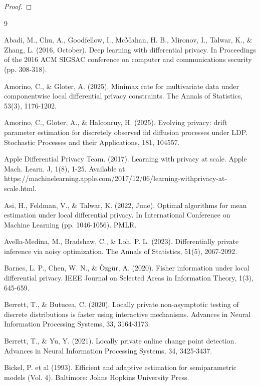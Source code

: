 \documentclass[a4paper, 11pt]{article}
\theoremstyle{definition}
\begin{document}
{\begin{proof}
\end{proof}



\appendix


 
\begin{thebibliography}{9}

 Abadi, M., Chu, A., Goodfellow, I., McMahan, H. B., Mironov, I., Talwar, K., \& Zhang, L. (2016, October). Deep learning with differential privacy. In Proceedings of the 2016 ACM SIGSAC conference on computer and communications security (pp. 308-318).

 Amorino, C., \& Gloter, A. (2025). Minimax rate for multivariate data under componentwise local differential privacy constraints. The Annals of Statistics, 53(3), 1176-1202.

 Amorino, C., Gloter, A., \& Halconruy, H. (2025). Evolving privacy: drift parameter estimation for discretely observed iid diffusion processes under LDP. Stochastic Processes and their Applications, 181, 104557.

 Apple Differential Privacy Team. (2017). Learning with privacy at scale. Apple Mach. Learn. J, 1(8), 1-25. Available at https://machinelearning.apple.com/2017/12/06/learning-withprivacy-at-scale.html.

 Asi, H., Feldman, V., \& Talwar, K. (2022, June). Optimal algorithms for mean estimation under local differential privacy. In International Conference on Machine Learning (pp. 1046-1056). PMLR.

 Avella-Medina, M., Bradshaw, C., \& Loh, P. L. (2023). Differentially private inference via noisy optimization. The Annals of Statistics, 51(5), 2067-2092.

 Barnes, L. P., Chen, W. N., \& Özgür, A. (2020). Fisher information under local differential privacy. IEEE Journal on Selected Areas in Information Theory, 1(3), 645-659.

 Berrett, T., \& Butucea, C. (2020). Locally private non-asymptotic testing of discrete distributions is faster using interactive mechanisms. Advances in Neural Information Processing Systems, 33, 3164-3173.

 Berrett, T., \& Yu, Y. (2021). Locally private online change point detection. Advances in Neural Information Processing Systems, 34, 3425-3437.

 Bickel, P. et al (1993). Efficient and adaptive estimation for semiparametric models (Vol. 4). Baltimore: Johns Hopkins University Press.


\end{thebibliography}}
\end{document}
